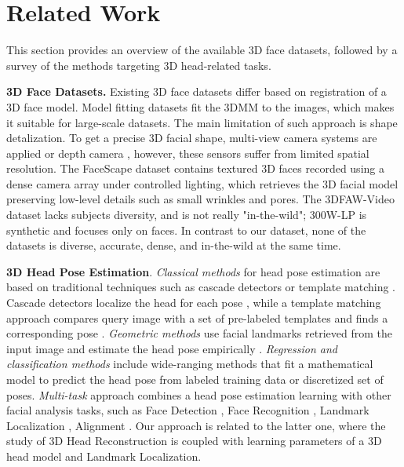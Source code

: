 \documentclass[10pt,twocolumn,letterpaper]{article}
\begin{document}
 \section{Related Work}

This section provides an overview of the available 3D face datasets, followed by a survey of the methods targeting 3D head-related tasks. 

{\bf 3D Face Datasets.} Existing 3D face datasets differ  based on registration of a 3D face model. Model fitting datasets \cite{rot_matrix_metrics, booth_2018, KF-ITW} fit the 3DMM to the images, which makes it suitable for large-scale datasets. The main limitation of such approach is shape detalization. To get a precise 3D facial shape, multi-view camera systems are applied \cite{BP4D, 6126510} or depth camera \cite{Bosphorus, BJUT, 4813324, 1613022, 7208488, cheng20174dfab}, however, these sensors suffer from limited spatial resolution. The FaceScape dataset \cite{FaceScape} contains textured 3D faces recorded using a dense camera array under controlled lighting, which retrieves the 3D facial model preserving low-level details such as small wrinkles and pores. The 3DFAW-Video dataset \cite{3DFAW-Video} lacks subjects diversity, and is not really "in-the-wild"; 300W-LP \cite{sagonas2016300, AFLW2000-3D} is synthetic and focuses only on faces.
In contrast to our dataset, none of the datasets is diverse, accurate, dense, and in-the-wild at the same time. 

\textbf{3D Head Pose Estimation}. \textit{Classical methods} for head pose estimation are based on traditional techniques such as cascade detectors \cite{Viola01rapidobject}  or template matching \cite{brunelli2009template}. 
Cascade detectors localize the head for each pose \cite{Kwong2002CompositeSV}, while a template matching approach compares query image with a set of pre-labeled templates and finds a corresponding pose \cite{HeadPoseEstimation, PoseDiscrimination}. \textit{Geometric methods} use facial landmarks retrieved from the input image and estimate the head pose empirically  \cite{Burger2014SelfinitializingHP, 557266}. \textit{Regression and classification methods} include wide-ranging methods that fit a mathematical model to predict the head pose from labeled training data or discretized set of poses\cite{1047456, head_pose_driver_monitoring, 7279167, nataniel, 6751256, benfold2008headpose}. \emph{Multi-task} approach combines a head pose estimation learning with other facial analysis tasks, such as Face Detection \cite{All-In-One, HyperFace, zhu2012face}, Face Recognition \cite{All-In-One}, Landmark Localization \cite{All-In-One, HyperFace, zhu2012face}, Alignment \cite{10.1007/978-3-319-10599-4_8, DBLP:journals/corr/ZhangZL016, All-In-One}. Our approach is related to the latter one, where the study of 3D Head Reconstruction is coupled with learning parameters of a 3D head model and Landmark Localization.
\end{document}

